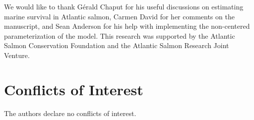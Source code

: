 \documentclass[12pt]{article}
\begin{document}
We would like to thank G\'{e}rald Chaput for his useful discussions on
estimating marine survival in Atlantic salmon, Carmen David for her comments
on the manuscript, and Sean Anderson for his help with implementing the
non-centered parameterization of the model. This research was supported by the
Atlantic Salmon Conservation Foundation and the Atlantic Salmon Research Joint
Venture.

\section*{Conflicts of Interest}

The authors declare no conflicts of interest.
 


%
\end{document}
